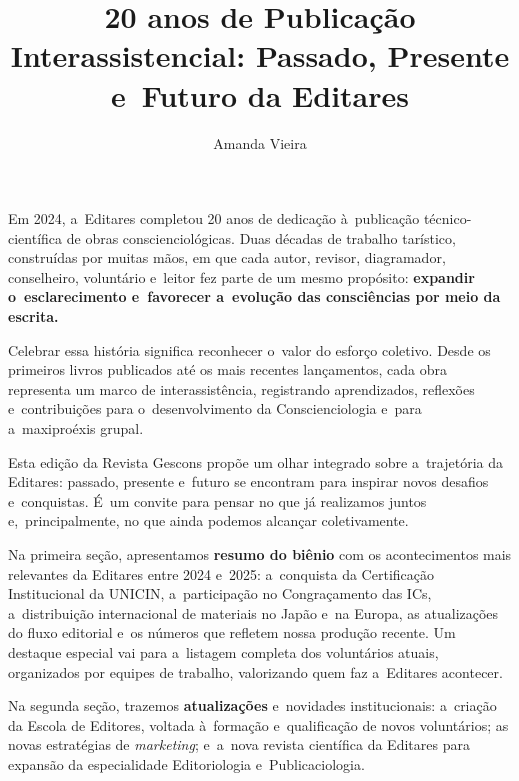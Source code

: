 \documentclass{gescons}
\author{Amanda Vieira}
\title{20 anos de Publicação Interassistencial: Passado, Presente e~Futuro da Editares}
\begin{document}
    \makeentrevistatitle



    \begin{multicols}{2}


Em 2024, a~Editares completou 20 anos de dedicação à~publicação técnico-científica de obras conscienciológicas. Duas décadas de trabalho tarístico, construídas por muitas mãos, em que cada autor, revisor, diagramador, conselheiro, voluntário e~leitor fez parte de um mesmo propósito: \textbf{expandir o~esclarecimento e~favorecer a~evolução das consciências por meio da escrita.}

Celebrar essa história significa reconhecer o~valor do esforço coletivo. Desde os primeiros livros publicados até os mais recentes lançamentos, cada obra representa um marco de interassistência, registrando aprendizados, reflexões e~contribuições para o~desenvolvimento da Conscienciologia e~para a~maxiproéxis grupal.

Esta edição da Revista Gescons propõe um olhar integrado sobre a~trajetória da Editares: passado, presente e~futuro se encontram para inspirar novos desafios e~conquistas. É~um convite para pensar no que já realizamos juntos e,~principalmente, no que ainda podemos alcançar coletivamente.

Na primeira seção, apresentamos \textbf{resumo do biênio} com os acontecimentos mais relevantes da Editares entre 2024 e~2025: a~conquista da Certificação Institucional da UNICIN, a~participação no Congraçamento das ICs, a~distribuição internacional de materiais no Japão e~na Europa, as atualizações do fluxo editorial e~os números que refletem nossa produção recente. Um destaque especial vai para a~listagem completa dos voluntários atuais, organizados por equipes de trabalho, valorizando quem faz a~Editares acontecer.

Na segunda seção, trazemos \textbf{atualizações} e~novidades institucionais: a~criação da Escola de Editores, voltada à~formação e~qualificação de novos voluntários; as novas estratégias de \emph{marketing}; e~a~nova revista científica da Editares para expansão da especialidade Editoriologia e~Publicaciologia. 


\end{multicols}
\end{document}
